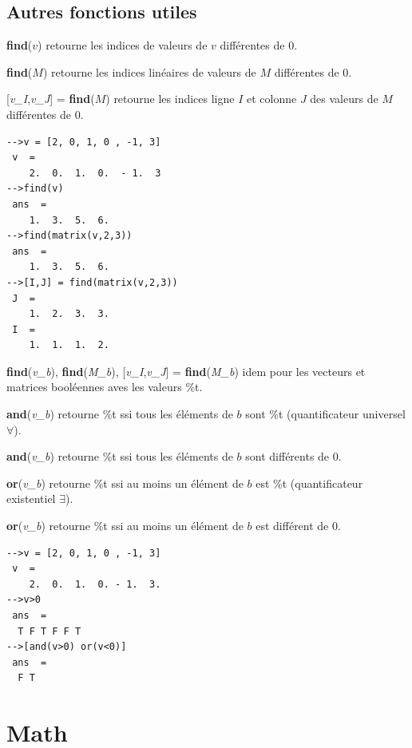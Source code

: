 \documentclass{article}
\begin{document}
\begin{multicols}{3}
\subsection{Autres fonctions utiles}
\begin{description}
\item{\textbf{find}($v$)} retourne les indices de valeurs de $v$ différentes de 0.
\item{\textbf{find}($M$)} retourne les indices linéaires de valeurs de $M$ 
différentes de 0.
\item{[\textit{v\_I},\textit{v\_J}] = \textbf{find}($M$)} retourne les indices ligne $I$ et colonne $J$  des valeurs de $M$ différentes de 0.
\begin{verbatim}
-->v = [2, 0, 1, 0 , -1, 3]
 v  =
    2.  0.  1.  0.  - 1.  3
-->find(v)
 ans  =
    1.  3.  5.  6.
-->find(matrix(v,2,3))
 ans  =
    1.  3.  5.  6.
-->[I,J] = find(matrix(v,2,3))
 J  =
    1.  2.  3.  3.  
 I  =
    1.  1.  1.  2. 
\end{verbatim}
\item{\textbf{find}(\textit{v\_b}), \textbf{find}(\textit{M\_b}),  [\textit{v\_I},\textit{v\_J}] = \textbf{find}(\textit{M\_b})} idem pour les vecteurs et matrices booléennes aves les valeurs \%t.
\item{\textbf{and}(\textit{v\_b})} retourne \%t ssi tous les éléments de $b$ sont \%t (quantificateur universel $\forall$).
\item{\textbf{and}(\textit{v\_b})} retourne \%t ssi tous les éléments de $b$ sont différents de 0.
\item{\textbf{or}(\textit{v\_b})} retourne \%t ssi au moins un élément de $b$ est \%t (quantificateur existentiel $\exists$).
\item{\textbf{or}(\textit{v\_b})} retourne \%t ssi au moins un élément de $b$ est différent de 0.
\begin{verbatim}
-->v = [2, 0, 1, 0 , -1, 3]
 v  =
    2.  0.  1.  0. - 1.  3.  
-->v>0
 ans  =
  T F T F F T  
-->[and(v>0) or(v<0)]
 ans  =
  F T
\end{verbatim}
\end{description}
\section{Math}

\end{multicols}
\end{document}
